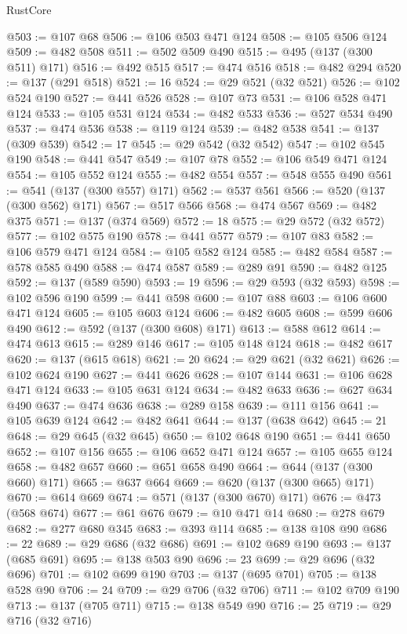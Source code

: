 \begin{lexlean}{RustCore}
\begin{coremodule}
{\begin{coremodule}
{{{{{{{{{{{{{{{{{{{{{{{{{{{{{{{{{{{{{{{{{{{{{{{@503 := @107 @68
@506 := @106 @503 @471 @124
@508 := @105 @506 @124
@509 := @482 @508
@511 := @502 @509 @490
@515 := @495 (@137 (@300 @511) @171)
@516 := @492 @515
@517 := @474 @516
@518 := @482 @294
@520 := @137 (@291 @518)
@521 := 16
@524 := @29 @521 (@32 @521)
@526 := @102 @524 @190
@527 := @441 @526
@528 := @107 @73
@531 := @106 @528 @471 @124
@533 := @105 @531 @124
@534 := @482 @533
@536 := @527 @534 @490
@537 := @474 @536
@538 := @119 @124
@539 := @482 @538
@541 := @137 (@309 @539)
@542 := 17
@545 := @29 @542 (@32 @542)
@547 := @102 @545 @190
@548 := @441 @547
@549 := @107 @78
@552 := @106 @549 @471 @124
@554 := @105 @552 @124
@555 := @482 @554
@557 := @548 @555 @490
@561 := @541 (@137 (@300 @557) @171)
@562 := @537 @561
@566 := @520 (@137 (@300 @562) @171)
@567 := @517 @566
@568 := @474 @567
@569 := @482 @375
@571 := @137 (@374 @569)
@572 := 18
@575 := @29 @572 (@32 @572)
@577 := @102 @575 @190
@578 := @441 @577
@579 := @107 @83
@582 := @106 @579 @471 @124
@584 := @105 @582 @124
@585 := @482 @584
@587 := @578 @585 @490
@588 := @474 @587
@589 := @289 @91
@590 := @482 @125
@592 := @137 (@589 @590)
@593 := 19
@596 := @29 @593 (@32 @593)
@598 := @102 @596 @190
@599 := @441 @598
@600 := @107 @88
@603 := @106 @600 @471 @124
@605 := @105 @603 @124
@606 := @482 @605
@608 := @599 @606 @490
@612 := @592 (@137 (@300 @608) @171)
@613 := @588 @612
@614 := @474 @613
@615 := @289 @146
@617 := @105 @148 @124
@618 := @482 @617
@620 := @137 (@615 @618)
@621 := 20
@624 := @29 @621 (@32 @621)
@626 := @102 @624 @190
@627 := @441 @626
@628 := @107 @144
@631 := @106 @628 @471 @124
@633 := @105 @631 @124
@634 := @482 @633
@636 := @627 @634 @490
@637 := @474 @636
@638 := @289 @158
@639 := @111 @156
@641 := @105 @639 @124
@642 := @482 @641
@644 := @137 (@638 @642)
@645 := 21
@648 := @29 @645 (@32 @645)
@650 := @102 @648 @190
@651 := @441 @650
@652 := @107 @156
@655 := @106 @652 @471 @124
@657 := @105 @655 @124
@658 := @482 @657
@660 := @651 @658 @490
@664 := @644 (@137 (@300 @660) @171)
@665 := @637 @664
@669 := @620 (@137 (@300 @665) @171)
@670 := @614 @669
@674 := @571 (@137 (@300 @670) @171)
@676 := @473 (@568 @674)
@677 := @61 @676
@679 := @10 @471 @14
@680 := @278 @679
@682 := @277 @680 @345
@683 := @393 @114
@685 := @138 @108 @90
@686 := 22
@689 := @29 @686 (@32 @686)
@691 := @102 @689 @190
@693 := @137 (@685 @691)
@695 := @138 @503 @90
@696 := 23
@699 := @29 @696 (@32 @696)
@701 := @102 @699 @190
@703 := @137 (@695 @701)
@705 := @138 @528 @90
@706 := 24
@709 := @29 @706 (@32 @706)
@711 := @102 @709 @190
@713 := @137 (@705 @711)
@715 := @138 @549 @90
@716 := 25
@719 := @29 @716 (@32 @716)
}}}}}}}}}}}}}}}}}}}}}}}}}}}}}}}}}}}}}}}}}}}}}}}
\end{coremodule}}
\end{coremodule}
\end{lexlean}
